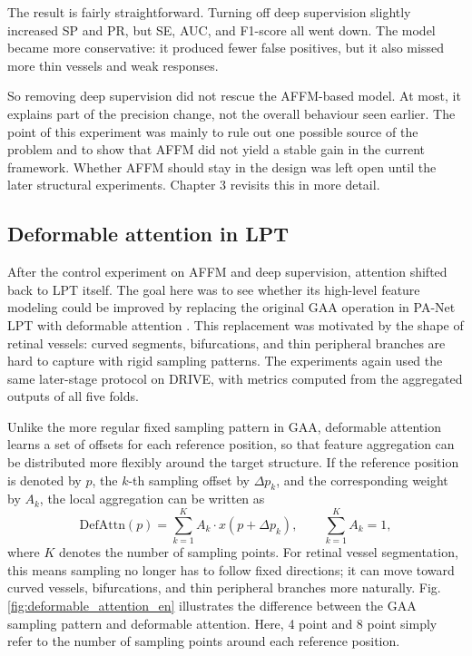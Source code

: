 \documentclass[a4paper,12pt]{article}
\begin{document}
The result is fairly straightforward. Turning off deep supervision slightly increased SP and PR, but SE, AUC, and F1-score all went down. The model became more conservative: it produced fewer false positives, but it also missed more thin vessels and weak responses.

So removing deep supervision did not rescue the AFFM-based model. At most, it explains part of the precision change, not the overall behaviour seen earlier. The point of this experiment was mainly to rule out one possible source of the problem and to show that AFFM did not yield a stable gain in the current framework. Whether AFFM should stay in the design was left open until the later structural experiments. Chapter 3 revisits this in more detail.

\subsection{Deformable attention in LPT}

After the control experiment on AFFM and deep supervision, attention shifted back to LPT itself. The goal here was to see whether its high-level feature modeling could be improved by replacing the original GAA operation in PA-Net LPT \cite{luo2025panet} with deformable attention \cite{zhu2021deformabledetr}. This replacement was motivated by the shape of retinal vessels: curved segments, bifurcations, and thin peripheral branches are hard to capture with rigid sampling patterns. The experiments again used the same later-stage protocol on DRIVE, with metrics computed from the aggregated outputs of all five folds.

Unlike the more regular fixed sampling pattern in GAA, deformable attention learns a set of offsets for each reference position, so that feature aggregation can be distributed more flexibly around the target structure. If the reference position is denoted by \(p\), the \(k\)-th sampling offset by \(\Delta p_k\), and the corresponding weight by \(A_k\), the local aggregation can be written as
\[
\mathrm{DefAttn}(p) = \sum_{k=1}^{K} A_k \cdot x(p + \Delta p_k),\qquad
\sum_{k=1}^{K} A_k = 1,
\]
where \(K\) denotes the number of sampling points. For retinal vessel segmentation, this means sampling no longer has to follow fixed directions; it can move toward curved vessels, bifurcations, and thin peripheral branches more naturally. Fig. \ref{fig:deformable_attention_en} illustrates the difference between the GAA sampling pattern and deformable attention. Here, 4 point and 8 point simply refer to the number of sampling points around each reference position.
\end{document}
